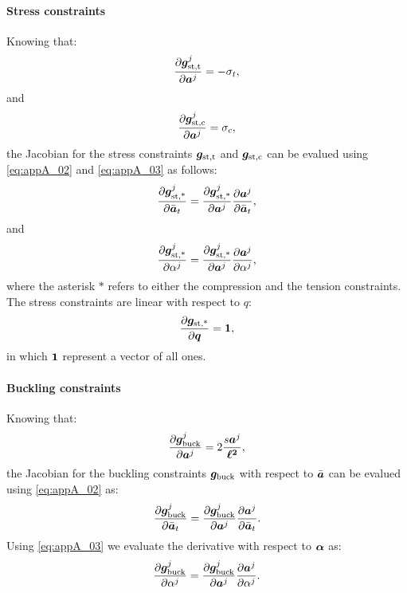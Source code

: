 \paragraph*{Stress constraints}
Knowing that:
\begin{equation}
    \frac{\partial\bm{g}_\text{st,t}^j}{\partial{\bm{a}^j}} = -\sigma_t,
\end{equation}
and
\begin{equation}
    \frac{\partial\bm{g}_\text{st,c}^j}{\partial{\bm{a}^j}} = \sigma_c,
\end{equation}
the Jacobian for the stress constraints $\bm{g}_\text{st,t}$ and $\bm{g}_\text{st,c}$ can be evalued using \eqref{eq:appA_02} and \eqref{eq:appA_03} as follows:
\begin{equation}
    \frac{\partial\bm{g}_\text{st,*}^j}{\partial\bar{\bm{a}}_t} = \frac{\partial\bm{g}_\text{st,*}^j}{\partial{\bm{a}^j}} \frac{\partial\bm{a}^j}{\partial\bar{\bm{a}}_t},
\end{equation}
and
\begin{equation}
    \frac{\partial\bm{g}_\text{st,*}^j}{\partial\alpha^j}=\frac{\partial\bm{g}_\text{st,*}^j}{\partial\bm{a}^j} \frac{\partial\bm{a}^j}{\partial\alpha^j},
\end{equation} 
where the asterisk $*$ refers to either the compression and the tension constraints. The stress constraints are linear with respect to $q$:
\begin{equation}
    \frac{\partial\bm{g}_\text{st,*}}{\partial\bm{q}}=\bm{1},
\end{equation}
in which $\bm{1}$ represent a vector of all ones.
\paragraph*{Buckling constraints} Knowing that:
\begin{equation}
    \frac{\partial\bm{g}_\text{buck}^j}{\partial\bm{a}^j} =  2\frac{s\bm{a}^j}{\bm{\ell^2}},
\end{equation}
the Jacobian for the buckling constraints $\bm{g}_\text{buck}$ with respect to $\bar{\bm{a}}$ can be evalued using \eqref{eq:appA_02} as:
\begin{equation}
    \frac{\partial\bm{g}_\text{buck}^j}{\partial\bar{\bm{a}}_t} = \frac{\partial\bm{g}_\text{buck}^j}{\partial{\bm{a}^j}} \frac{\partial\bm{a}^j}{\partial\bar{\bm{a}}_t}.
\end{equation}
Using \eqref{eq:appA_03} we evaluate the derivative with respect to $\bm{\alpha}$ as:
\begin{equation}
    \frac{\partial\bm{g}_\text{buck}^j}{\partial\alpha^j}=\frac{\partial\bm{g}_\text{buck}^j}{\partial\bm{a}^j} \frac{\partial\bm{a}^j}{\partial\alpha^j}.
\end{equation}
